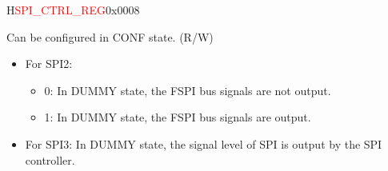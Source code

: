\begin{register}{H}{\textcolor{red}{SPI\_CTRL\_REG}}{0x{}0008}\label{regdesc:SPICTRLREG}
%
%
%
%
%
%
%
%
%
%
%
%
%
%
%
%
%
%
%
%
%
%
\regnewline%
\begin{regdesc}\begin{reglist}
\label{fielddesc:SPIDUMMYOUT}\item [SPI\_DUMMY\_OUT] Can be configured in CONF state. (R/W)
\begin{itemize}
    \item For SPI2:
    \begin{itemize}
        \item 0: In DUMMY state, the FSPI bus signals are not output.
        \item 1: In DUMMY state, the FSPI bus signals are output.
    \end{itemize}
    \item For SPI3: In DUMMY state, the signal level of SPI is output by the SPI controller.
\end{itemize}


\end{reglist}
\end{regdesc}
\end{register}
